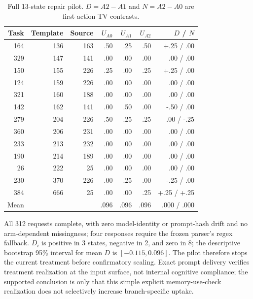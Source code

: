 \begin{table}[h]
\centering
\scriptsize
\caption{Full 13-state repair pilot. $D=A2-A1$ and $N=A2-A0$ are first-action TV contrasts.}
\label{tab:repair-pilot-full}
\begin{tabular}{rrrrrrr}
\toprule
Task & Template & Source & $U_{A0}$ & $U_{A1}$ & $U_{A2}$ & $D$ / $N$ \\
\midrule
164 & 136 & 163 & .50 & .25 & .50 & +.25 / .00 \\
329 & 147 & 141 & .00 & .00 & .00 & .00 / .00 \\
150 & 155 & 226 & .25 & .00 & .25 & +.25 / .00 \\
124 & 159 & 226 & .00 & .00 & .00 & .00 / .00 \\
321 & 160 & 188 & .00 & .00 & .00 & .00 / .00 \\
142 & 162 & 141 & .00 & .50 & .00 & -.50 / .00 \\
279 & 204 & 226 & .50 & .25 & .25 & .00 / -.25 \\
360 & 206 & 231 & .00 & .00 & .00 & .00 / .00 \\
233 & 213 & 232 & .00 & .00 & .00 & .00 / .00 \\
190 & 214 & 189 & .00 & .00 & .00 & .00 / .00 \\
26  & 222 & 25  & .00 & .00 & .00 & .00 / .00 \\
230 & 370 & 226 & .00 & .25 & .00 & -.25 / .00 \\
384 & 666 & 25  & .00 & .00 & .25 & +.25 / +.25 \\
\midrule
Mean & & & .096 & .096 & .096 & .000 / .000 \\
\bottomrule
\end{tabular}
\end{table}

All 312 requests complete, with zero model-identity or prompt-hash drift and no arm-dependent missingness; four responses require the frozen parser's regex fallback. $D_i$ is positive in 3 states, negative in 2, and zero in 8; the descriptive bootstrap 95\% interval for mean $D$ is $[-0.115,0.096]$. The pilot therefore stops the current treatment before confirmatory scaling. Exact prompt delivery verifies treatment realization at the input surface, not internal cognitive compliance; the supported conclusion is only that this simple explicit memory-use-check realization does not selectively increase branch-specific uptake.
